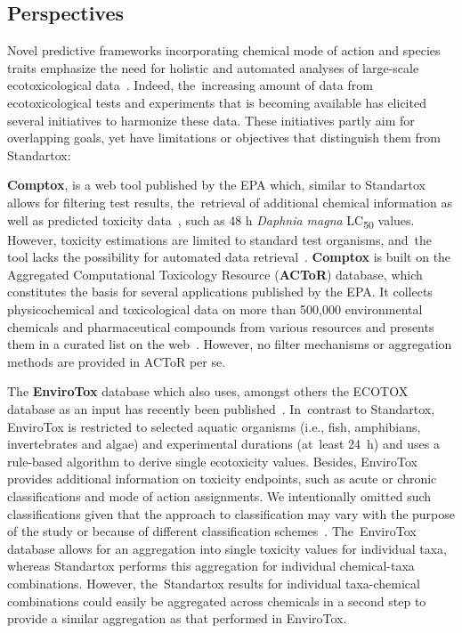 \documentclass[data,datadescriptor,accept,moreauthors,pdftex]{Definitions/mdpi}
\begin{document}
\subsection{Perspectives}
Novel predictive frameworks incorporating chemical mode of action and species traits emphasize the need for holistic and automated analyses of large-scale ecotoxicological data~\citep{malaj_evolutionary_2016, vandenberg_modeling_2019}. Indeed, the~increasing amount of data from ecotoxicological tests and experiments that is becoming available has elicited several initiatives to harmonize these data. These initiatives partly aim for overlapping goals, yet have limitations or objectives that distinguish them from Standartox:
\par
\textbf{Comptox}, is a web tool published by the EPA which, similar to Standartox allows for filtering test results, the~retrieval of additional chemical information as well as predicted toxicity data~\citep{martin_prediction_2001}, such as 48 h \textit{Daphnia magna} LC\textsubscript{50} values. However, toxicity estimations are limited to standard test organisms, and~the tool lacks the possibility for automated data retrieval~\citep{williams_comptox_2017}. \textbf{Comptox} is built on the Aggregated Computational Toxicology Resource (\textbf{ACToR}) database, which constitutes the basis for several applications published by the EPA. It collects physicochemical and toxicological data on more than 500,000 environmental chemicals and pharmaceutical compounds from various resources and presents them in a curated list on the web~\citep{judson_actor_2008, judson_aggregating_2012}. However, no filter mechanisms or aggregation methods are provided in ACToR per se.
\par
The \textbf{EnviroTox} database which also uses, amongst others the ECOTOX database as an input has recently been published~\citep{healthandenvironmentalsciencesinstitutehesi_envirotox_2019, connors_creation_2019}. In~contrast to Standartox, EnviroTox  is restricted to selected aquatic organisms (i.e., fish, amphibians, invertebrates and algae) and experimental durations (at~least 24~h) and uses a rule-based algorithm to derive single ecotoxicity values. Besides, EnviroTox provides additional information on toxicity endpoints, such as acute or chronic classifications and mode of action assignments. We intentionally omitted such classifications given that the approach to classification may vary with the purpose of the study or because of different classification schemes~\citep{kienzler_mode_2017}. The~EnviroTox database allows for an aggregation into single toxicity values for individual taxa, whereas Standartox performs this aggregation for individual chemical-taxa combinations. However, the~Standartox results for individual taxa-chemical combinations could easily be aggregated across chemicals in a second step to provide a similar aggregation as that performed in EnviroTox.
\end{document}
